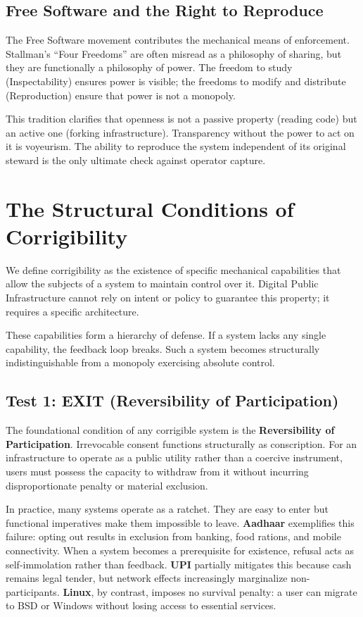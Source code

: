 \documentclass{article}
\begin{document}
\subsection{Free Software and the Right to Reproduce}

The Free Software movement \citep{stallman2002} contributes the mechanical means of enforcement. Stallman's ``Four Freedoms'' are often misread as a philosophy of sharing, but they are functionally a philosophy of power. The freedom to study (Inspectability) ensures power is visible; the freedoms to modify and distribute (Reproduction) ensure that power is not a monopoly.

This tradition clarifies that openness is not a passive property (reading code) but an active one (forking infrastructure). Transparency without the power to act on it is voyeurism. The ability to reproduce the system independent of its original steward is the only ultimate check against operator capture.

\section{The Structural Conditions of Corrigibility}
\label{sec:tests}

We define corrigibility as the existence of specific mechanical capabilities that allow the subjects of a system to maintain control over it. Digital Public Infrastructure cannot rely on intent or policy to guarantee this property; it requires a specific architecture.

These capabilities form a hierarchy of defense. If a system lacks any single capability, the feedback loop breaks. Such a system becomes structurally indistinguishable from a monopoly exercising absolute control.

\subsection{Test 1: EXIT (Reversibility of Participation)}

The foundational condition of any corrigible system is the \textbf{Reversibility of Participation}. Irrevocable consent functions structurally as conscription. For an infrastructure to operate as a public utility rather than a coercive instrument, users must possess the capacity to withdraw from it without incurring disproportionate penalty or material exclusion.

In practice, many systems operate as a ratchet. They are easy to enter but functional imperatives make them impossible to leave. \textbf{Aadhaar} exemplifies this failure: opting out results in exclusion from banking, food rations, and mobile connectivity. When a system becomes a prerequisite for existence, refusal acts as self-immolation rather than feedback. \textbf{UPI} partially mitigates this because cash remains legal tender, but network effects increasingly marginalize non-participants. \textbf{Linux}, by contrast, imposes no survival penalty: a user can migrate to BSD or Windows without losing access to essential services.
\end{document}
